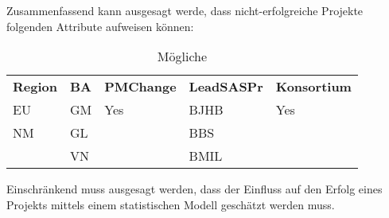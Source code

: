 Zusammenfassend kann ausgesagt werde, dass nicht-erfolgreiche Projekte folgenden Attribute aufweisen können:
\begin{table}[H]
	\centering
	\caption{Mögliche}
	\begin{tabular}{rlrlr}
		\multicolumn{1}{l}{\textbf{Region}} & \textbf{BA} & \multicolumn{1}{l}{\textbf{PMChange}} & \textbf{LeadSASPr} & \multicolumn{1}{l}{\textbf{Konsortium}} \\
		\multicolumn{1}{l}{EU} & GM    & \multicolumn{1}{l}{Yes} & BJHB  & \multicolumn{1}{l}{Yes} \\
		\multicolumn{1}{l}{NM} & GL    &       & BBS   &  \\
		& VN    &       & BMIL  &  \\
	\end{tabular}%
	
	\label{tab:addlabel}%
\end{table}%
Einschränkend muss ausgesagt werden, dass der Einfluss auf den Erfolg eines Projekts mittels einem statistischen Modell geschätzt werden muss.  
\newpage

